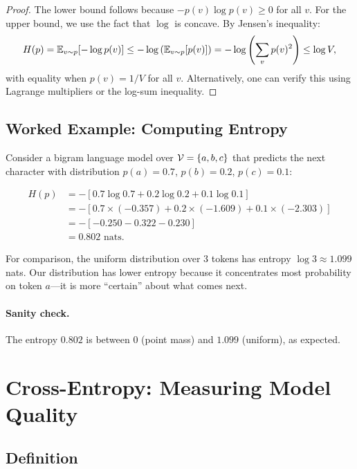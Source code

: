 \begin{proof}
The lower bound follows because $-p(v)\log p(v) \geq 0$ for all $v$. For the upper bound, we use the fact that $\log$ is concave. By Jensen's inequality:
\begin{equation}
H(p) = \mathbb{E}_{v \sim p}[-\log p(v)] \leq -\log\left(\mathbb{E}_{v \sim p}[p(v)]\right) = -\log\left(\sum_{v} p(v)^2\right) \leq \log V,
\end{equation}
with equality when $p(v) = 1/V$ for all $v$. Alternatively, one can verify this using Lagrange multipliers or the log-sum inequality.
\end{proof}

\subsection{Worked Example: Computing Entropy}

Consider a bigram language model over $\mathcal{V} = \{a, b, c\}$ that predicts the next character with distribution $p(a) = 0.7$, $p(b) = 0.2$, $p(c) = 0.1$:

\begin{align}
H(p) &= -[0.7 \log 0.7 + 0.2 \log 0.2 + 0.1 \log 0.1] \\
      &= -[0.7 \times (-0.357) + 0.2 \times (-1.609) + 0.1 \times (-2.303)] \\
      &= -[-0.250 - 0.322 - 0.230] \\
      &= 0.802 \text{ nats}.
\end{align}

For comparison, the uniform distribution over 3 tokens has entropy $\log 3 \approx 1.099$ nats. Our distribution has lower entropy because it concentrates most probability on token $a$---it is more ``certain'' about what comes next.

\paragraph{Sanity check.} The entropy $0.802$ is between $0$ (point mass) and $1.099$ (uniform), as expected.

\section{Cross-Entropy: Measuring Model Quality}
\label{ch:01:sec:cross_entropy}

\subsection{Definition}

